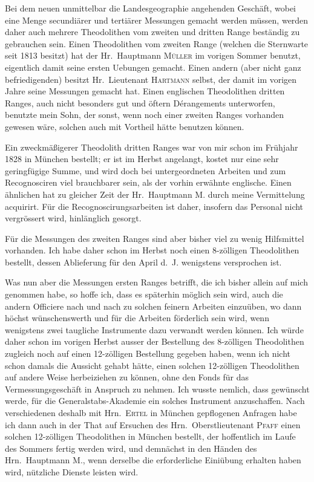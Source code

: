 \documentclass[12pt,a4paper]{article}
\theoremstyle{plain}
\theoremstyle{definition}
\theoremstyle{remark}
\begin{document}
Bei dem neuen unmittelbar die Landesgeographie angehenden Gesch\"aft, wobei eine Menge secundi\"arer und terti\"arer Messungen gemacht werden m\"ussen, werden daher auch mehrere Theodolithen vom zweiten und dritten Range best\"andig zu gebrauchen sein. Einen Theodolithen vom zweiten Range (welchen die Sternwarte seit 1813 besitzt) hat der Hr.\ Hauptmann \textsc{M\"uller} im vorigen Sommer benutzt, eigentlich damit seine ersten Uebungen gemacht. Einen andern (aber nicht ganz befriedigenden) besitzt Hr.\ Lieutenant \textsc{Hartmann} selbst, der damit im vorigen Jahre seine Messungen gemacht hat. Einen englischen Theodolithen dritten Ranges, auch nicht besonders gut und \"oftern D\'erangements unterworfen, benutzte mein Sohn, der sonst, wenn noch einer zweiten Ranges vorhanden gewesen w\"are, solchen auch mit Vortheil h\"atte benutzen k\"onnen.

Ein zweckm\"a\ss igerer Theodolith dritten Ranges war von mir schon im Fr\"uhjahr 1828 in M\"unchen bestellt; er ist im Herbst angelangt, kostet nur eine sehr geringf\"ugige Summe, und wird doch bei untergeordneten Arbeiten und zum Recognosciren viel brauchbarer sein, als der vorhin erw\"ahnte englische. Einen \"ahnlichen hat zu gleicher Zeit der Hr.\ Hauptmann \textsc{M.} durch meine Vermittelung acquirirt. F\"ur die Recognoscirungsarbeiten ist daher, insofern das Personal nicht vergr\"ossert wird, hinl\"anglich gesorgt.

F\"ur die Messungen des zweiten Ranges sind aber bisher viel zu wenig Hilfsmittel vorhanden. Ich habe daher schon im Herbst noch einen 8-z\"olligen Theodolithen bestellt, dessen Ablieferung f\"ur den April d.\ J. wenigstens versprochen ist.

Was nun aber die Messungen ersten Ranges betrifft, die ich bisher allein auf mich genommen habe, so hoffe ich, dass es sp\"aterhin m\"oglich sein wird, auch die andern Officiere nach und nach zu solchen feinern Arbeiten einzu\"uben, wo dann h\"ochst w\"unschenswerth und f\"ur die Arbeiten f\"orderlich sein wird, wenn wenigstens zwei taugliche Instrumente dazu verwandt werden k\"onnen. Ich w\"urde daher schon im vorigen Herbst ausser der Bestellung des 8-z\"olligen Theodolithen zugleich noch auf einen 12-z\"olligen Bestellung gegeben haben, wenn ich nicht schon damals die Aussicht gehabt h\"atte, einen solchen 12-z\"olligen Theodolithen auf andere Weise herbeiziehen zu k\"onnen, ohne den Fonds f\"ur das Vermessungsgesch\"aft in Anspruch zu nehmen. Ich wusste nemlich, dass gew\"unscht werde, f\"ur die Generalstabs-Akademie ein solches Instrument anzuschaffen. Nach verschiedenen deshalb mit Hrn.\ \textsc{Ertel} in M\"unchen gepflogenen Anfragen habe ich dann auch in der That auf Ersuchen des Hrn.\ Oberstlieutenant \textsc{Pfaff} einen solchen 12-z\"olligen Theodolithen in M\"unchen bestellt, der hoffentlich im Laufe des Sommers fertig werden wird, und demn\"achst in den H\"anden des Hrn.\ Hauptmann \textsc{M.}, wenn derselbe die erforderliche Eini\"ubung erhalten haben wird, n\"utzliche Dienste leisten wird.
\end{document}
